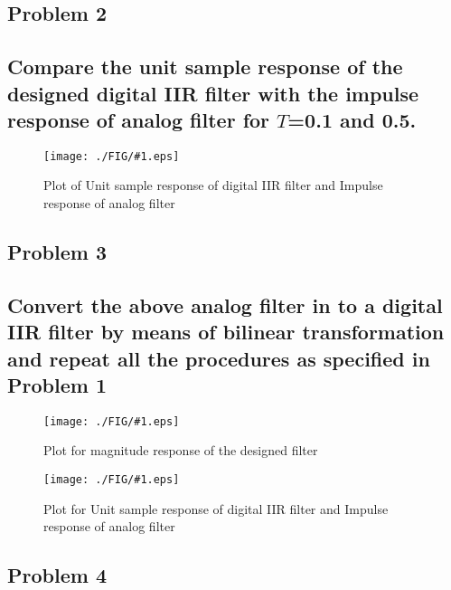 \documentclass[a4paper,11pt]{article}
\newcommand{\mobs}[2]{
    \begin{figure}[H]
        \centering
        \texttt{[image: ./FIG/\#1.eps]}
        \caption{#2}
    \end{figure}
   
}
\begin{document}
\subsection{Problem 2}
\subsection*{Compare the unit sample response of the designed digital IIR filter with the impulse response of analog filter for $T$=0.1 and 0.5.}
\mobs{p2}{Plot of Unit sample response of digital IIR filter and  Impulse response of analog filter}




\subsection{Problem 3}
\subsection*{Convert the above analog filter in to a digital IIR filter by means of bilinear transformation and repeat all the procedures as specified in Problem 1}


\mobs{p3a}{Plot for magnitude response of the designed filter}


\mobs{p3b}{Plot for Unit sample response of digital IIR filter and  Impulse response of analog filter }





\subsection{Problem 4}
\end{document}
